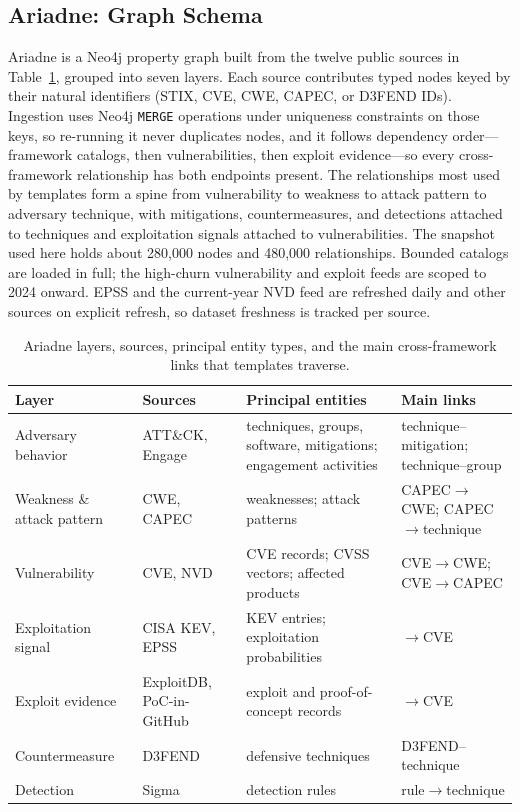 \documentclass[conference]{IEEEtran}
\begin{document}
\subsection{Ariadne: Graph Schema}
Ariadne is a Neo4j property graph built from the twelve public sources in Table~\ref{tab:schema}, grouped into seven layers. Each source contributes typed nodes keyed by their natural identifiers (STIX, CVE, CWE, CAPEC, or D3FEND IDs). Ingestion uses Neo4j \texttt{MERGE} operations under uniqueness constraints on those keys, so re-running it never duplicates nodes, and it follows dependency order---framework catalogs, then vulnerabilities, then exploit evidence---so every cross-framework relationship has both endpoints present. The relationships most used by templates form a spine from vulnerability to weakness to attack pattern to adversary technique, with mitigations, countermeasures, and detections attached to techniques and exploitation signals attached to vulnerabilities. The snapshot used here holds about 280,000 nodes and 480,000 relationships. Bounded catalogs are loaded in full; the high-churn vulnerability and exploit feeds are scoped to 2024 onward. EPSS and the current-year NVD feed are refreshed daily and other sources on explicit refresh, so dataset freshness is tracked per source.

\begin{table}[t]
\caption{Ariadne layers, sources, principal entity types, and the main cross-framework links that templates traverse.}
\label{tab:schema}
\centering
\scriptsize
\setlength{\tabcolsep}{2.5pt}
\begin{tabular}{@{}p{}p{}p{}p{}@{}}
\toprule
Layer & Sources & Principal entities & Main links \\
\midrule
Adversary behavior & ATT\&CK, Engage & techniques, groups, software, mitigations; engagement activities & technique--mitigation; technique--group \\
Weakness \& attack pattern & CWE, CAPEC & weaknesses; attack patterns & CAPEC$\rightarrow$CWE; CAPEC$\rightarrow$technique \\
Vulnerability & CVE, NVD & CVE records; CVSS vectors; affected products & CVE$\rightarrow$CWE; CVE$\rightarrow$CAPEC \\
Exploitation signal & CISA KEV, EPSS & KEV entries; exploitation probabilities & $\rightarrow$CVE \\
Exploit evidence & ExploitDB, PoC-in-GitHub & exploit and proof-of-concept records & $\rightarrow$CVE \\
Counter\-measure & D3FEND & defensive techniques & D3FEND--technique \\
Detection & Sigma & detection rules & rule$\rightarrow$technique \\
\bottomrule
\end{tabular}
\end{table}
\end{document}
